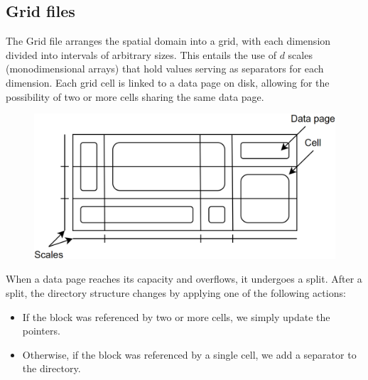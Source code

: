\subsection{Grid files}
The Grid file arranges the spatial domain into a grid, with each dimension divided into intervals of arbitrary sizes. 
This entails the use of $d$ scales (monodimensional arrays) that hold values serving as separators for each dimension. 
Each grid cell is linked to a data page on disk, allowing for the possibility of two or more cells sharing the same data page.
\begin{figure}[H]
    \centering
    \includegraphics[width=0.5\linewidth]{images/grid.png}
\end{figure}
When a data page reaches its capacity and overflows, it undergoes a split.
After a split, the directory structure changes by applying one of the following actions: 
\begin{itemize}
    \item If the block was referenced by two or more cells, we simply update the pointers.
    \item Otherwise, if the block was referenced by a single cell, we add a separator to the directory.
\end{itemize} 

